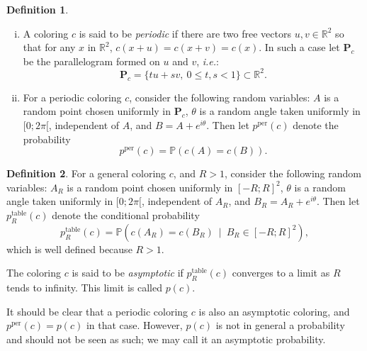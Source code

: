 \documentclass[a4paper,11pt]{article}
\theoremstyle{definition}
\newtheorem{definition}{Definition}
\theoremstyle{remark}
\newcommand{\R}{\mathbb{R}}
\renewcommand{\Pr}{\mathbb{P}}
\renewcommand{\P}{\mathbf{P}}
\newcommand{\pper}{p^{\mathrm{per}}}
\newcommand{\ptable}{p^{\mathrm{table}}}
\begin{document}
\begin{definition}
\
\begin{enumerate}[i)] \label{pper}
\item A coloring $c$ is said to be \textit{periodic} if there are two free
vectors $u,v\in \R^2$ so that for any $x$ in $\R ^2$, $c(x+u)=c(x+v)=c(x)$. In such a
case let $\P_c$ be the parallelogram formed on $u$ and $v$, \textit{i.e.}:
\[\P_c = \{tu+sv, \ 0\leq t,s< 1 \} \subset \R ^2. \]
\item For a periodic coloring $c$, consider the following random variables:
$A$ is a random point chosen uniformly in $\P_c$, 
$\theta$ is a random angle taken uniformly in $[0;2 \pi[$, independent of $A$, 
and $B=A + e^{i \theta}$.
Then let $\pper(c)$ denote the probability
$$\pper(c) = \Pr(c(A)=c(B)).$$
\end{enumerate}
\end{definition}

\begin{definition}
\label{defas}For a general coloring $c$, and $R>1$, consider the 
following random variables:
$A_R$ is a random point chosen uniformly in $[-R;R]^2$, 
$\theta$ is a random angle taken uniformly in $[0;2 \pi[$, independent of $A_R$, 
and $B_R=A_R + e^{i \theta}$.
Then let $\ptable_R(c)$ denote the conditional probability
$$\ptable_R(c) = \Pr \left( c(A_R)=c(B_R) \ \mid \ B_R \in [-R;R]^2 \right),$$
which is well defined because $R>1$.

The coloring $c$ is said to be \textit{asymptotic} if $\ptable_R(c)$
converges to a limit as $R$ tends to infinity. This limit is called $p(c)$.
\end{definition}

It should be clear that a periodic coloring $c$ is also an asymptotic coloring,
and $\pper(c)=p(c)$ in that case. However, $p(c)$ is not
in general a probability and should not be seen as such; we may call it an 
asymptotic probability.
\smallskip
\end{document}
